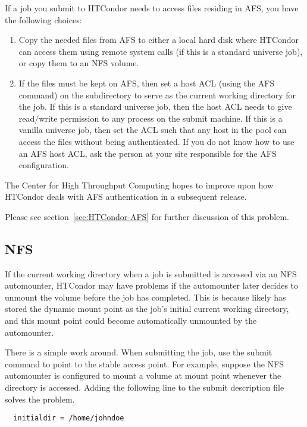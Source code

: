 If a job you submit to HTCondor needs to access files residing in AFS,
you have the following choices:
\begin{enumerate}
\item Copy the needed files from AFS to either a local hard disk where 
HTCondor can access them using remote system calls (if
this is a standard universe job), or copy them to an NFS volume.
\item If the files must be kept on AFS, then set a host ACL
(using the AFS  command) on the subdirectory to
serve as the current working directory for the job.
If this is a standard universe job, then the host ACL needs
to give read/write permission to any process on the submit machine.
If this is a vanilla universe job, then set the ACL such that any host 
in the pool can access the files without being authenticated.
If you do not know how to use an AFS host ACL, ask the person at your 
site responsible for the AFS configuration.
\end{enumerate}

The Center for High Throughput Computing hopes to improve upon how 
HTCondor deals with AFS 
authentication in a subsequent release.

Please see section~\ref{sec:HTCondor-AFS} for
further discussion of this problem.

\subsection{NFS}

If the current working directory when a job is submitted
is accessed via an NFS automounter, HTCondor may have problems if the
automounter later decides to unmount the volume before the job has
completed.
This is because  likely has stored the
dynamic mount point as the job's initial current working directory, and
this mount point could become automatically unmounted by the
automounter.

There is a simple work around.
When submitting the job,
use the submit command  to point to
the stable access point.
For example,
suppose the NFS automounter is configured to mount a volume at mount point
whenever the directory  is accessed.
Adding the following line to the
submit description file solves the problem.
\begin{verbatim}
  initialdir = /home/johndoe
\end{verbatim}

